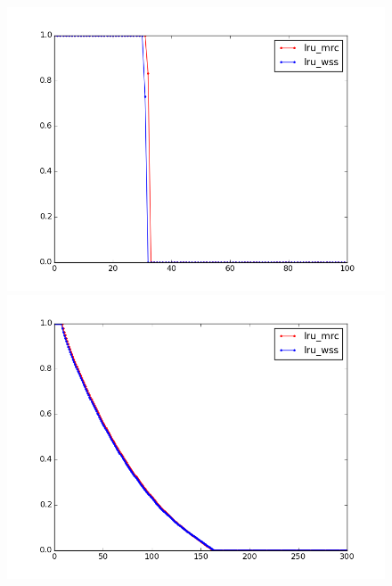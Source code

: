 \documentclass[10pt,twocolumn]{article}
\begin{document}
\begin{figure}
{\begin{minipage}[b]{0.2\textwidth}
			\includegraphics[width=1\textwidth]{img/mrc_cmp/mrc_cmp_fulllib_1491934003.png} \\
			\includegraphics[width=1\textwidth]{img/mrc_cmp/mrc_cmp_fullsjeng_1491930705.png} \\
		\end{minipage}
	}
\end{figure}
\end{document}
